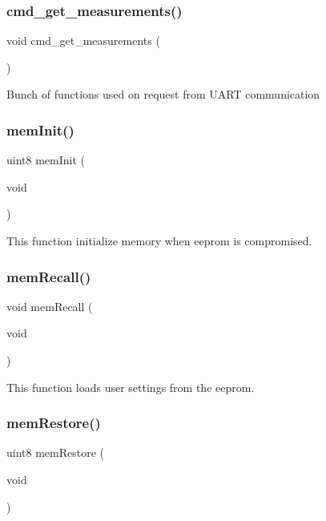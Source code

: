 \subsubsection{cmd\+\_\+get\+\_\+measurements()}
{\footnotesize\ttfamily void cmd\+\_\+get\+\_\+measurements (\begin{DoxyParamCaption}{ }\end{DoxyParamCaption})}

Bunch of functions used on request from U\+A\+RT communication \mbox{\label{command__processing_8h_a48f1d2aa212e255d0a3322e576fc8574}} 
\subsubsection{mem\+Init()}
{\footnotesize\ttfamily uint8 mem\+Init (\begin{DoxyParamCaption}\item[{void}]{ }\end{DoxyParamCaption})}

This function initialize memory when eeprom is compromised. \mbox{\label{command__processing_8h_a494f1f72ae370f0057e5aa3db73ef6fb}} 
\subsubsection{mem\+Recall()}
{\footnotesize\ttfamily void mem\+Recall (\begin{DoxyParamCaption}\item[{void}]{ }\end{DoxyParamCaption})}

This function loads user settings from the eeprom. \mbox{\label{command__processing_8h_af67845c368ea7fefb79a1f0baa12134c}} 
\subsubsection{mem\+Restore()}
{\footnotesize\ttfamily uint8 mem\+Restore (\begin{DoxyParamCaption}\item[{void}]{ }\end{DoxyParamCaption})}

